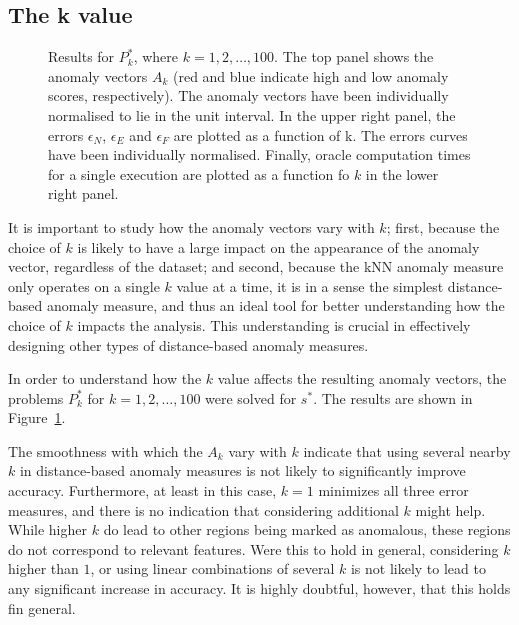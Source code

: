 \subsection{The k value}

\begin{figure}
    \centering
        \caption{Results for $P^*_k$, where $k = 1,2,\dots,100$. The top panel shows the anomaly vectors $A_k$ (red and blue indicate high and low anomaly scores, respectively). The anomaly vectors have been individually normalised to lie in the unit interval. In the upper right panel, the errors $\epsilon_N$, $\epsilon_E$ and $\epsilon_F$ are plotted as a function of k. The errors curves have been individually normalised. Finally, oracle computation times for a single execution are plotted as a function fo $k$ in the lower right panel.}
\label{fig:k_plot}
\end{figure}

It is important to study how the anomaly vectors vary with $k$; first, because the choice of $k$ is likely to have a large impact on the appearance of the anomaly vector, regardless of the dataset; and second, because the kNN anomaly measure only operates on a single $k$ value at a time, it is in a sense the simplest distance-based anomaly measure, and thus an ideal tool for better understanding how the choice of $k$ impacts the analysis. This understanding is crucial in effectively designing other types of distance-based anomaly measures.

In order to understand how the $k$ value affects the resulting anomaly vectors, the problems $P^*_k$ for $k = 1,2,\dots,100$ were solved for $s^*$. The results are shown in Figure~\ref{fig:k_plot}.

The smoothness with which the $A_k$ vary with $k$ indicate that using several nearby $k$ in distance-based anomaly measures is not likely to significantly improve accuracy. Furthermore, at least in this case, $k=1$ minimizes all three error measures, and there is no indication that considering additional $k$ might help. While higher $k$ do lead to other regions being marked as anomalous, these regions do not correspond to relevant features. Were this to hold in general, considering $k$ higher than $1$, or using linear combinations of several $k$ is not likely to lead to any significant increase in accuracy. It is highly doubtful, however, that this holds fin general.

